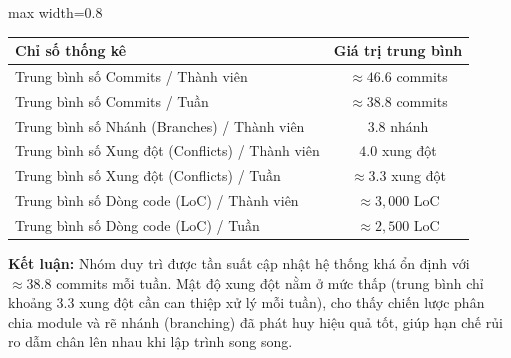 \documentclass[12pt,a4paper]{article}
\begin{document}
\begin{table}[H]
\centering
\renewcommand{\arraystretch}{1.4}
\begin{adjustbox}{max width=0.8\textwidth}
\begin{tabular}{|l|c|}
\hline
\rowcolor{gray!15}
\textbf{Chỉ số thống kê} & \textbf{Giá trị trung bình} \\ \hline
Trung bình số Commits / Thành viên & $\approx 46.6$ commits \\ \hline
Trung bình số Commits / Tuần & $\approx 38.8$ commits \\ \hline
Trung bình số Nhánh (Branches) / Thành viên & $3.8$ nhánh \\ \hline
Trung bình số Xung đột (Conflicts) / Thành viên & $4.0$ xung đột \\ \hline
Trung bình số Xung đột (Conflicts) / Tuần & $\approx 3.3$ xung đột \\ \hline
Trung bình số Dòng code (LoC) / Thành viên & $\approx 3,000$ LoC \\ \hline
Trung bình số Dòng code (LoC) / Tuần & $\approx 2,500$ LoC \\ \hline
\end{tabular}
\end{adjustbox}
\end{table}

\vspace{0.2cm}
\noindent\textbf{Kết luận:} 
Nhóm duy trì được tần suất cập nhật hệ thống khá ổn định với $\approx 38.8$ commits mỗi tuần.
Mật độ xung đột nằm ở mức thấp (trung bình chỉ khoảng 3.3 xung đột cần can thiệp xử lý mỗi tuần), cho thấy chiến lược phân chia module và rẽ nhánh (branching) đã phát huy hiệu quả tốt, giúp hạn chế rủi ro dẫm chân lên nhau khi lập trình song song.
\end{document}

